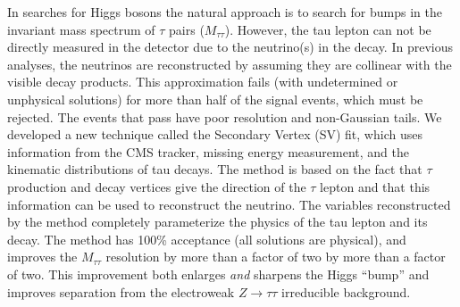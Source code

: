\documentclass[a4paper,10pt,oneside]{article}
\begin{document}
In searches for Higgs bosons the natural approach is to search for bumps in the
invariant mass spectrum of $\tau$ pairs ($M_{\tau\tau}$).  However, the tau
lepton can not be directly measured in the detector due to the neutrino(s) in
the decay.  In previous analyses, the neutrinos are reconstructed by assuming
they are collinear with the visible decay products.  This approximation fails
(with undetermined or unphysical solutions) for more than half of the signal
events, which must be rejected.  The events that pass have poor resolution and
non-Gaussian tails.  We developed a new technique called the Secondary Vertex
(SV) fit, which uses information from the CMS tracker, missing energy
measurement, and the kinematic distributions of tau decays.  The method is based
on the fact that $\tau$ production and decay vertices give the direction of the
$\tau$ lepton and that this information can be used to reconstruct the neutrino.
The variables reconstructed by the method completely parameterize the physics of
the tau lepton and its decay.  The method has 100\% acceptance (all solutions
are physical), and improves the $M_{\tau\tau}$ resolution by more than a factor
of two by more than a factor of two.  This improvement both enlarges \emph{and}
sharpens the Higgs ``bump'' and improves separation from the electroweak
$Z\rightarrow\tau\tau$ irreducible background.
\end{document}
